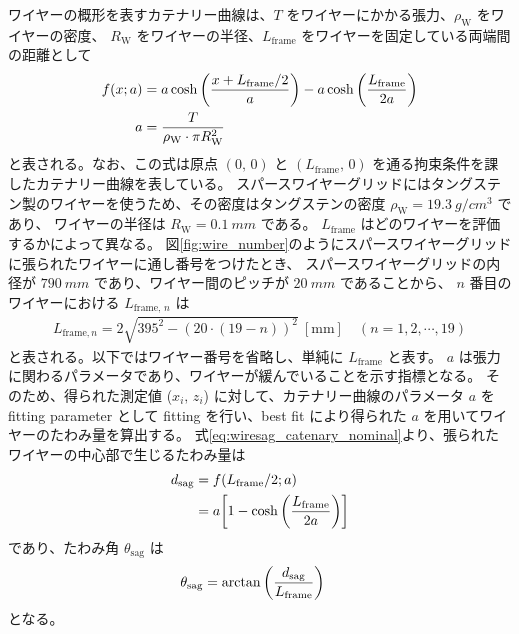 \documentclass[../../main.tex]{subfiles}
\begin{document}
ワイヤーの概形を表すカテナリー曲線は、$T$ をワイヤーにかかる張力、$\rho_{\mathrm{W}}$ をワイヤーの密度、
$R_{\mathrm{W}}$ をワイヤーの半径、$L_{\mathrm{frame}}$ をワイヤーを固定している両端間の距離として
\begin{align}
    \label{eq:wiresag_catenary_nominal}
    f(x;a) &= a\cosh\qty(\dfrac{x+L_{\mathrm{frame}}/2}{a}) - a\cosh\qty(\dfrac{L_{\mathrm{frame}}}{2a}) \\
    a &= \dfrac{T}{\rho_{\mathrm{W}}\cdot\pi R_{\mathrm{W}}^2}
\end{align}
と表される。なお、この式は原点 $(0,\,0)$ と $(L_{\mathrm{frame}},\,0)$ を通る拘束条件を課したカテナリー曲線を表している。
スパースワイヤーグリッドにはタングステン製のワイヤーを使うため、その密度はタングステンの密度 $\rho_{\mathrm{W}}=\SI{19.3}{g/cm^3}$ であり、
ワイヤーの半径は $R_{\mathrm{W}}=\SI{0.1}{mm}$ である。
$L_{\mathrm{frame}}$ はどのワイヤーを評価するかによって異なる。
図\ref{fig:wire_number}のようにスパースワイヤーグリッドに張られたワイヤーに通し番号をつけたとき、
スパースワイヤーグリッドの内径が $\SI{790}{mm}$ であり、ワイヤー間のピッチが $\SI{20}{mm}$ であることから、
$n$ 番目のワイヤーにおける $L_{\mathrm{frame},\,n}$ は
\begin{align}
    \label{eq:wiresag_frame_length}
    L_{\mathrm{frame}, n} = 2\sqrt{395^2-(20\cdot(19-n))^2}\ [\mathrm{mm}] \quad (n=1,2,\cdots,19)
\end{align}
と表される。以下ではワイヤー番号を省略し、単純に $L_{\mathrm{frame}}$ と表す。
$a$ は張力に関わるパラメータであり、ワイヤーが緩んでいることを示す指標となる。
そのため、得られた測定値 ($x_{i},\,z_{i}$) に対して、カテナリー曲線のパラメータ $a$ を fitting parameter として
fitting を行い、best fit により得られた $a$ を用いてワイヤーのたわみ量を算出する。
式\eqref{eq:wiresag_catenary_nominal}より、張られたワイヤーの中心部で生じるたわみ量は
\begin{align}
    d_{\mathrm{sag}} &= f(L_{\mathrm{frame}}/2;a) \\
    \label{eq:wiresag_sag}
                     &= a\qty[1-\cosh\qty(\dfrac{L_{\mathrm{frame}}}{2a})]
\end{align}
であり、たわみ角 $\theta_{\mathrm{sag}}$ は
\begin{align}
    \label{eq:wiresag_sag_angle}
    \theta_{\mathrm{sag}} &= \arctan\qty(\dfrac{d_{\mathrm{sag}}}{L_{\mathrm{frame}}})
\end{align}
となる。
\end{document}

